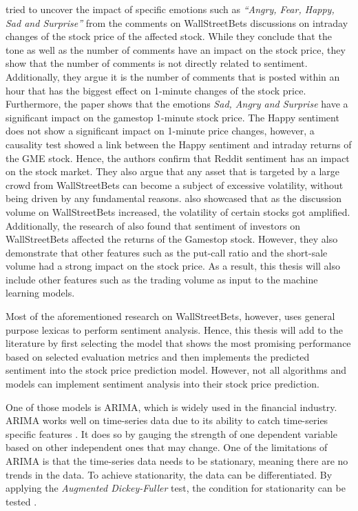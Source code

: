 \documentclass[11pt, a4paper]{article}
\begin{document}
\cite{long2021LikeTheStock} tried to uncover the impact of specific emotions such as \emph{“Angry, Fear, Happy, Sad and Surprise”} from the comments on 
WallStreetBets discussions on intraday changes of the stock price of the affected stock. While they conclude that the tone as well as the number of 
comments have an impact on the stock price, they show that the number of comments is not directly related to sentiment. Additionally, they argue it 
is the number of comments that is posted within an hour that has the biggest effect on 1-minute changes of the stock price. Furthermore, the paper 
shows that the emotions \emph{Sad, Angry and Surprise} have a significant impact on the gamestop 1-minute stock price. The Happy sentiment does not show a 
significant impact on 1-minute price changes, however, a causality test showed a link between the Happy sentiment and intraday returns of the GME stock. 
Hence, the authors confirm that Reddit 
sentiment has an impact on the stock market. They also argue that any asset that is targeted by a large crowd from WallStreetBets can become a subject 
of excessive volatility, without being driven by any fundamental reasons.
\cite{lyocsa2021yolotrading} also showcased that as the discussion volume on WallStreetBets increased, the volatility of certain stocks got amplified. 
Additionally, the research of \cite{umar2021ataleofcompanyfundamentals} also found that sentiment of investors on WallStreetBets affected the returns of the Gamestop stock. 
However, they also demonstrate that other features such as the put-call ratio and the short-sale volume had a strong impact on the stock price. As a result, this thesis
will also include other features such as the trading volume as input to the machine learning models.

Most of the aforementioned research on WallStreetBets, however, uses general purpose lexicas to perform sentiment analysis. Hence, this thesis will add to the literature 
by first selecting the model that shows the most promising performance based on selected evaluation metrics and then implements the predicted sentiment into the stock price prediction model.
However, not all algorithms and models can implement sentiment analysis into their stock price prediction.

One of those models is ARIMA, which is widely used in the financial industry. ARIMA works well on time-series data due to its
ability to catch time-series specific features \citep{vuong2021forecasting}. It does so by gauging the strength of one dependent variable based on other independent
ones that may change. One of the limitations of ARIMA is that the time-series data needs to be stationary, meaning there are no trends in the data. To achieve
stationarity, the data can be differentiated. By applying the \emph{Augmented Dickey-Fuller} test, the condition for stationarity can be tested \citep{ivanovic2013arima}.
\end{document}
